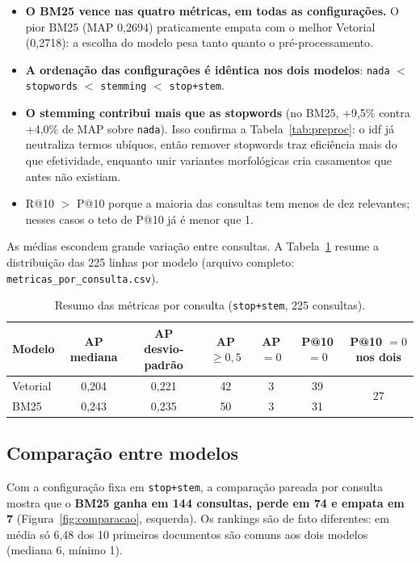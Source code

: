 \documentclass[10pt,a4paper]{article}
\begin{document}
\begin{itemize}
  \item \textbf{O BM25 vence nas quatro métricas, em todas as configurações.} O pior BM25 (MAP
  0,2694) praticamente empata com o melhor Vetorial (0,2718): a escolha do modelo pesa tanto
  quanto o pré-processamento.
  \item \textbf{A ordenação das configurações é idêntica nos dois modelos}:
  \texttt{nada} $<$ \texttt{stopwords} $<$ \texttt{stemming} $<$ \texttt{stop+stem}.
  \item \textbf{O stemming contribui mais que as stopwords} (no BM25, +9,5\% contra +4,0\% de MAP
  sobre \texttt{nada}). Isso confirma a Tabela~\ref{tab:preproc}: o idf já neutraliza termos
  ubíquos, então remover stopwords traz eficiência mais do que efetividade, enquanto unir variantes
  morfológicas cria casamentos que antes não existiam.
  \item R@10 $>$ P@10 porque a maioria das consultas tem menos de dez relevantes; nesses casos o
  teto de P@10 já é menor que 1.
\end{itemize}

As médias escondem grande variação entre consultas. A Tabela~\ref{tab:porconsulta} resume a
distribuição das 225 linhas por modelo (arquivo completo: \texttt{metricas\_por\_consulta.csv}).

\begin{table}[h]
\centering\small
\caption{Resumo das métricas por consulta (\texttt{stop+stem}, 225 consultas).}
\label{tab:porconsulta}
\begin{tabular}{lcccccc}
\toprule
Modelo & AP mediana & AP desvio-padrão & AP $\geq 0{,}5$ & AP $=0$ & P@10 $=0$ & P@10 $=0$ nos dois \\
\midrule
Vetorial & 0,204 & 0,221 & 42 & 3 & 39 & \multirow{2}{*}{27} \\
BM25     & 0,243 & 0,235 & 50 & 3 & 31 & \\
\bottomrule
\end{tabular}
\end{table}

\subsection{Comparação entre modelos}
Com a configuração fixa em \texttt{stop+stem}, a comparação pareada por consulta mostra que o
\textbf{BM25 ganha em 144 consultas, perde em 74 e empata em 7} (Figura~\ref{fig:comparacao},
esquerda). Os rankings são de fato diferentes: em média só 6,48 dos 10 primeiros documentos são
comuns aos dois modelos (mediana 6, mínimo 1).
\end{document}
